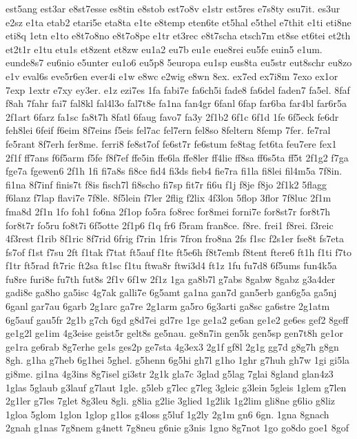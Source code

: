 {est5ang
est3ar
e8st7esse
es8tin
e8stob
est7o8v
e1str
est5res
e7s8ty
esu7it.
es3ur
e2sz
e1ta
etab2
etari5e
eta8ta
e1te
e8temp
eten6te
et5hal
e5thel
e7thit
e1ti
eti8ne
eti8q
1etn
e1to
e8t7o8no
e8t7o8pe
e1tr
et3rec
e8t7scha
etsch7m
et8se
et6tei
et2th
et2t1r
e1tu
etu1s
et8zent
et8zw
eu1a2
eu7b
eu1e
eue8rei
eu5fe
euin5
e1um.
eunde8s7
eu6nio
e5unter
eu1o6
eu5p8
5europa
eu1sp
eus8ta
eu5str
eut8schr
eu8zo
e1v
eval6s
eve5r6en
ever4i
e1w
e8wc
e2wig
e8wn
8ex.
ex7ed
ex7i8m
7exo
ex1or
7exp
1extr
e7xy
ey3er.
e1z
ezi7es
1fa
fabi7e
fa6ch5i
fade8
fa6del
faden7
fa5el.
8faf
f8ah
7fahr
fai7
fal8kl
fal4l3o
fal7t8e
fa1na
fan4gr
6fanl
6fap
far6ba
far4bl
far6r5a
2f1art
6farz
fa1sc
fa8t7h
8fatl
6faug
favo7
fa3y
2f1b2
6f1c
6f1d
1fe
6f5eck
fe6dr
feh8lei
6feif
f6eim
8f7eins
f5eis
fel7ac
fel7ern
fel8so
8feltern
8femp
7fer.
fe7ral
fe5rant
8f7erh
fer8me.
ferri8
fe8st7of
fe6st7r
fe6stum
fe8tag
fet6ta
feu7ere
fex1
2f1f
ff7ans
f6f5arm
f5fe
f8f7ef
ffe5in
ffe6la
ffe8ler
ff4lie
ff8sa
ff6s5ta
ff5t
2f1g2
f7ga
fge7a
fgewen6
2f1h
1fi
fi7a8s
fi8ce
fid4
fi3ds
fieb4
fie7ra
fi1la
fi8lei
fil4m5a
7f8in.
fi1na
8f7inf
finis7t
f8is
fisch7l
fi8scho
fi7sp
fit7r
fi6u
f1j
f8je
f8jo
2f1k2
5flagg
f6lanz
f7lap
flavi7e
7f8le.
8f5lein
f7ler
2flig
f2lix
4f3lon
5flop
3flor
7f8luc
2f1m
fma8d
2f1n
1fo
foh1
fo6na
2f1op
fo5ra
fo8rec
for8mei
forni7e
for8st7r
for8t7h
for8t7r
fo5ru
fo8t7i
6f5otte
2f1p6
f1q
fr6
f5ram
fran8ce.
f8re.
frei1
f8rei.
f3reic
4f3rest
f1rib
8f1ric
8f7rid
6frig
f7rin
1fris
7fron
fro8na
2fs
f1sc
f2s1er
fse8t
fs7eta
fs7of
f1st
f7su
2ft
f1tak
f7tat
ft5auf
f1te
ft5e6h
f8t7emb
f8tent
ftere6
ft1h
f1ti
f7to
f1tr
ft5rad
ft7ric
ft2sa
ft1sc
f1tu
ftwa8r
ftwi3d4
ft1z
1fu
fu7d8
6f5ums
fun4k5a
fu8re
furi8e
fu7th
fut8s
2f1v
6f1w
2f1z
1ga
ga8b7l
g7abs
8gabw
8gabz
g3a4der
gadi8e
ga8ho
ga5isc
4g7ak
galli7e
6g5amt
ga1na
gan7d
gan5erb
gan6g5a
ga5nj
6ganl
gar7au
6garb
2g1arc
ga7re
2g1arm
ga5ro
6g3arti
ga8sc
ga6stre
2g1atm
6g5auf
gau5fr
2g1b
g7ch
6gd
g8d7ei
gd7re
1ge
ge1a2
ge6an
ge1e2
ge6es
gef2
8geff
ge1g2l
ge1im
4g3eise
geist5r
gelt8s
ge5nau.
ge8n7in
gen5k
gen5sp
gen7t8h
ge1or
ge1ra
ge6rab
8g7erhe
ge1s
ges2p
ge7sta
4g3ex3
2g1f
gf8l
2g1g
gg7d
g8g7h
g8gn
8gh.
g1ha
g7heb
6g1hei
5ghel.
g5henn
6g5hi
gh7l
g1ho
1ghr
g7huh
gh7w
1gi
gi5la
gi8me.
gi1na
4g3ins
8g7isel
gi3str
2g1k
gla7c
3glad
g5lag
7glai
8gland
glan4z3
1glas
5glaub
g3lauf
g7laut
1gle.
g5leb
g7lec
g7leg
3gleic
g3lein
5gleis
1glem
g7len
2g1ler
g7les
7glet
8g3leu
8gli.
g8lia
g2lie
3glied
1g2lik
1g2lim
gli8ne
g6lio
g8liz
1gloa
5glom
1glon
1glop
g1los
g4loss
g5luf
1g2ly
2g1m
gn6
6gn.
1gna
8gnach
2gnah
g1nas
7g8nem
g4nett
7g8neu
g6nie
g3nis
1gno
8g7not
1go
go8do
goe1
8gof
}

